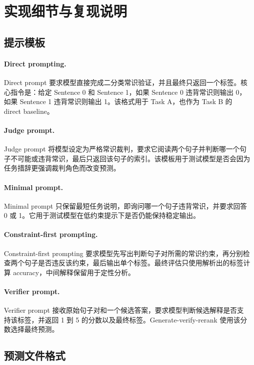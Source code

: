 \section{实现细节与复现说明}

\subsection{提示模板}

\paragraph{Direct prompting.}
Direct prompt 要求模型直接完成二分类常识验证，并且最终只返回一个标签。核心指令是：给定 Sentence 0 和 Sentence 1，如果 Sentence 0 违背常识则输出 0，如果 Sentence 1 违背常识则输出 1。该格式用于 Task A，也作为 Task B 的 direct baseline。

\paragraph{Judge prompt.}
Judge prompt 将模型设定为严格常识裁判，要求它阅读两个句子并判断哪一个句子不可能或违背常识，最后只返回该句子的索引。该模板用于测试模型是否会因为任务措辞更强调裁判角色而改变预测。

\paragraph{Minimal prompt.}
Minimal prompt 只保留最短任务说明，即询问哪一个句子违背常识，并要求回答 0 或 1。它用于测试模型在低约束提示下是否仍能保持稳定输出。

\paragraph{Constraint-first prompting.}
Constraint-first prompting 要求模型先写出判断句子对所需的常识约束，再分别检查两个句子是否违反该约束，最后输出单个标签。最终评估只使用解析出的标签计算 accuracy，中间解释保留用于定性分析。

\paragraph{Verifier prompt.}
Verifier prompt 接收原始句子对和一个候选答案，要求模型判断候选解释是否支持该标签，并返回 1 到 5 的分数以及最终标签。Generate-verify-rerank 使用该分数选择最终预测。

\subsection{预测文件格式}

